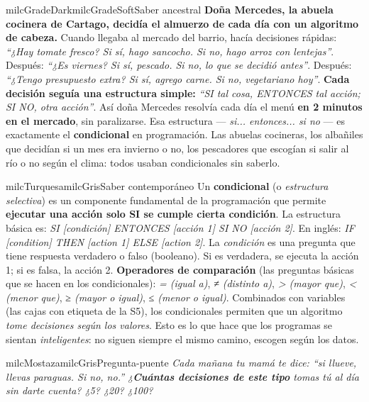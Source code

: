 \documentclass[11pt,letterpaper]{article}
\begin{document}
\begin{softbox}{milcGradeDark}{milcGradeSoft}{Saber ancestral}
\textbf{Doña Mercedes, la abuela cocinera de Cartago, decidía el almuerzo de cada día con un algoritmo de cabeza.} Cuando llegaba al mercado del barrio, hacía decisiones rápidas: \emph{``¿Hay tomate fresco? Si sí, hago sancocho. Si no, hago arroz con lentejas''}. Después: \emph{``¿Es viernes? Si sí, pescado. Si no, lo que se decidió antes''}. Después: \emph{``¿Tengo presupuesto extra? Si sí, agrego carne. Si no, vegetariano hoy''}. \textbf{Cada decisión seguía una estructura simple:} \emph{``SI tal cosa, ENTONCES tal acción; SI NO, otra acción''}. Así doña Mercedes resolvía cada día el menú \textbf{en 2 minutos en el mercado}, sin paralizarse. Esa estructura --- \emph{si... entonces... si no} --- es exactamente el \textbf{condicional} en programación. Las abuelas cocineras, los albañiles que decidían si un mes era invierno o no, los pescadores que escogían si salir al río o no según el clima: todos usaban condicionales sin saberlo.
\end{softbox}

\begin{softbox}{milcTurquesa}{milcGris}{Saber contemporáneo}
Un \textbf{condicional} (o \emph{estructura selectiva}) es un componente fundamental de la programación que permite \textbf{ejecutar una acción solo SI se cumple cierta condición}. La estructura básica es: \emph{SI [condición] ENTONCES [acción 1] SI NO [acción 2]}. En inglés: \emph{IF [condition] THEN [action 1] ELSE [action 2]}. La \emph{condición} es una pregunta que tiene respuesta verdadero o falso (booleano). Si es verdadera, se ejecuta la acción 1; si es falsa, la acción 2. \textbf{Operadores de comparación} (las preguntas básicas que se hacen en los condicionales): \emph{= (igual a)}, \emph{≠ (distinto a)}, \emph{> (mayor que)}, \emph{< (menor que)}, \emph{≥ (mayor o igual)}, \emph{≤ (menor o igual)}. Combinados con variables (las cajas con etiqueta de la S5), los condicionales permiten que un algoritmo \emph{tome decisiones según los valores}. Esto es lo que hace que los programas se sientan \emph{inteligentes}: no siguen siempre el mismo camino, escogen según los datos.
\end{softbox}

\begin{softbox}{milcMostaza}{milcGris}{Pregunta-puente}
\textit{Cada mañana tu mamá te dice: \emph{``si llueve, llevas paraguas. Si no, no.''} ¿\textbf{Cuántas decisiones de este tipo} tomas tú al día sin darte cuenta? ¿5? ¿20? ¿100?}
\end{softbox}
\end{document}
